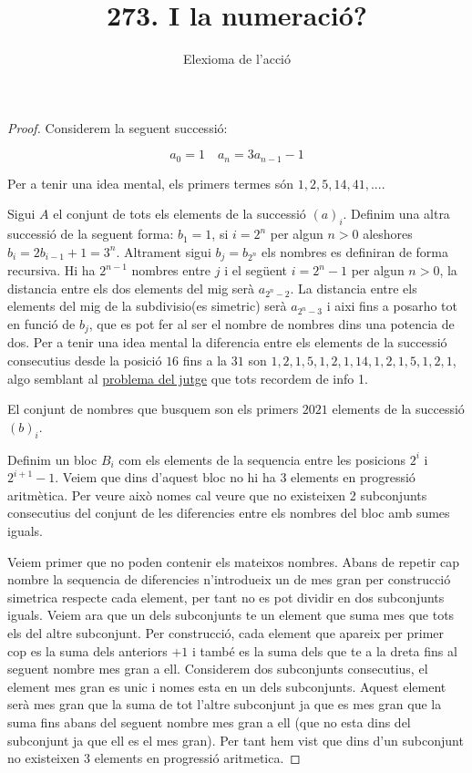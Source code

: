 \documentclass[12pt, a4papre]{article}
\author{Elexioma de l'acció}
\title{273. I la numeració?}
\date{}
\begin{document}
	\maketitle
	
	\begin{proof} Considerem la seguent successió:
	
	\[
		a_0 = 1 \quad a_n = 3a_{n-1}-1
	\]
	
	Per a tenir una idea mental, els primers termes són $1,2,5,14,41,...$.
	
	Sigui $A$ el conjunt de tots els elements de la successió $(a)_i$. Definim una altra successió de la seguent forma: $b_1 = 1$, si $i = 2^n$ per algun $n > 0$ aleshores $b_i = 2b_{i-1}+1 = 3^n$. Altrament sigui $b_j = b_{2^n}$ els nombres es definiran de forma recursiva. Hi ha $2^{n-1}$ nombres entre $j$ i el següent $i = 2^n-1$ per algun $n > 0$, la distancia entre els dos elements del mig serà $a_{2^n-2}$. La distancia entre els elements del mig de la subdivisio(es simetric) serà $a_{2^n-3}$ i aixi fins a posarho tot en funció de $b_j$, que es pot fer al ser el nombre de nombres dins una potencia de dos. Per a tenir una idea mental la diferencia entre els elements de la successió consecutius desde la posició $16$ fins a la $31$ son $1,2,1,5,1,2,1,14,1,2,1,5,1,2,1$, algo semblant al \href{https://jutge.org/problems/P62467_en}{problema del jutge} que tots recordem de info 1. 
	
	El conjunt de nombres que busquem son els primers $2021$ elements de la successió $(b)_i$.
	
	Definim un bloc $B_i$ com els elements de la sequencia entre les posicions $2^i$ i $2^{i+1}-1$. Veiem que dins d'aquest bloc no hi ha $3$ elements en progressió aritmètica. Per veure això nomes cal veure que no existeixen 2 subconjunts consecutius del conjunt de les diferencies entre els nombres del bloc amb sumes iguals.
	
	Veiem primer que no poden contenir els mateixos nombres. Abans de repetir cap nombre la sequencia de diferencies n'introdueix un de mes gran per construcció simetrica respecte cada element, per tant no es pot dividir en dos subconjunts iguals. Veiem ara que un dels subconjunts te un element que suma mes que tots els del altre subconjunt. Per construcció, cada element que apareix per primer cop es la suma dels anteriors $+1$ i també es la suma dels que te a la dreta fins al seguent nombre mes gran a ell. Considerem dos subconjunts consecutius, el element mes gran es unic i nomes esta en un dels subconjunts. Aquest element serà mes gran que la suma de tot l'altre subconjunt ja que es mes gran que la suma fins abans del seguent nombre mes gran a ell (que no esta dins del subconjunt ja que ell es el mes gran). Per tant hem vist que dins d'un subconjunt no existeixen 3 elements en progressió aritmetica.
	

\end{proof}
\end{document}
